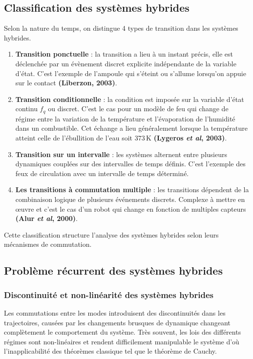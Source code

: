 \documentclass[12pt, oneside]{report} %
\theoremstyle{definition}
\theoremstyle{remark}
\begin{document}
	\subsection{Classification des systèmes hybrides}
	\label{sub:driven} 
	Selon la nature du temps, on distingue 4 types de transition dans les systèmes hybrides.
	\begin{enumerate}
		\item \textbf{Transition ponctuelle} :
		la transition a lieu à un instant précis, elle est déclenchée par un évènement discret explicite indépendante de la variable d'état. C'est l'exemple de l'ampoule qui s'éteint ou s'allume lorsqu'on appuie sur le contact \textbf{(Liberzon, 2003)}.
		\item \textbf{Transition conditionnelle} : 
		la condition est imposée sur la variable d'état continu $f_q$ ou discret. C'est le cas pour un modèle de feu qui change de régime entre la variation de la température et l'évaporation de l'humidité dans un combustible. Cet échange a lieu généralement lorsque la température atteint celle de l'ébullition de l'eau soit $373\,\mathrm{K}$ \textbf{(Lygeros \textit{et al}, 2003)}.
		\item \textbf{Transition sur un intervalle} :
		les systèmes alternent entre plusieurs dynamiques couplées sur des intervalles de temps définis. C'est l'exemple des feux de circulation avec un intervalle de temps déterminé. 
		\item \textbf{Les transitions à commutation multiple} : les transitions dépendent de la combinaison logique de plusieurs événements discrets. Complexe à mettre en œuvre et c'est le cas d'un robot qui change en fonction de multiples capteurs \textbf{(Alur \textit{et al}, 2000)}.
	\end{enumerate}
	Cette classification structure l'analyse des systèmes hybrides selon leurs mécanismes de commutation.
	
	\subsection{Problème récurrent des systèmes hybrides}
	\subsubsection{Discontinuité et non-linéarité des systèmes hybrides}
	Les commutations entre les modes introduisent des discontinuités dans les trajectoires, causées par les changements brusques de dynamique changeant complètement le comportement du système. Très souvent, les lois des différents régimes sont non-linéaires et rendent difficilement manipulable le système d'où l'inapplicabilité des théorèmes classique tel que le théorème de Cauchy.
	
\end{document}
